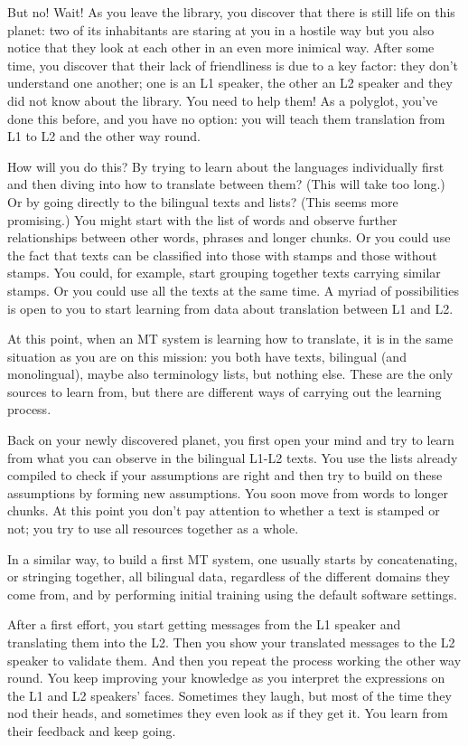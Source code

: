 \documentclass[output=paper]{langscibook}
\begin{document}
But no! Wait! As you leave the library, you discover that there is still life on this  planet: two of its inhabitants  are staring at you in a hostile way but you also notice that they look at each other in an even more inimical way. After some time, you discover that their lack of friendliness is due to a key factor: they don't understand one another; one is an L1 speaker, the other an L2 speaker and they did not know about the library. You need to help them! As a polyglot, you've done this before, and you have no option: you will teach them translation from L1 to L2 and the other way round.

How will you do this? By trying to learn about the languages individually first and then diving into how to translate between them? (This will take too long.) Or by going directly to the bilingual texts and lists? (This seems more promising.) You might start with the list of words and observe further relationships between other words, phrases and longer chunks. Or you could use the fact that texts can be classified into those with stamps and those without stamps. You could, for example, start grouping together texts carrying similar stamps. Or you could use all the texts at the same time. A myriad of possibilities is open to you to start learning from data about translation between L1 and L2.

At this point, when an MT system is learning how to translate, it is in the same situation as you are on this mission: you both have texts, bilingual (and monolingual), maybe also terminology lists, but nothing else. These are the only sources to learn from, but there are different ways of carrying out the learning process.

Back on your newly discovered planet, you first open your mind and try to learn from what you can observe in the bilingual L1-L2 texts. You use the lists already compiled to check if your assumptions are right and then try to build on these assumptions by forming  new assumptions. You soon move from words to longer chunks. At this point you don’t pay attention to whether a text is stamped or not; you try to use all resources together as a whole.

In a similar way, to build a first MT system, one usually starts by concatenating, or stringing together, all bilingual data, regardless of the different domains they come from, and by performing initial training using the default software settings.

After a first effort, you start getting messages from the L1 speaker and translating them into the L2. Then you show your translated messages to the L2 speaker to validate them. And then you repeat the process working the other way round. You keep improving your knowledge as you interpret the expressions on the L1  and L2 speakers' faces. Sometimes they laugh, but most of the time they nod their heads, and sometimes they even look as if they get it. You learn from their feedback and keep going.
\end{document}
